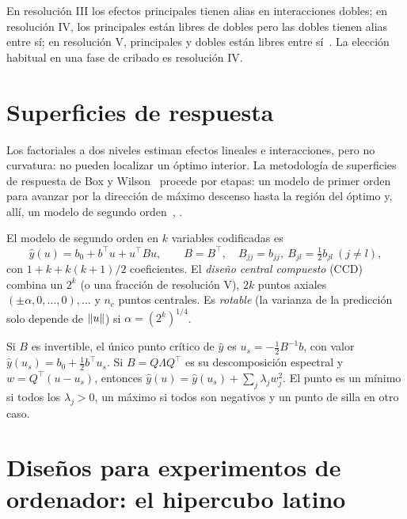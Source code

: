 En resolución III los efectos principales tienen alias en interacciones dobles; en resolución IV, los principales están libres de dobles pero las dobles tienen alias entre sí; en resolución V, principales y dobles están libres entre sí~\cite[§8.6–8.7]{montgomery}. La elección habitual en una fase de cribado es resolución IV.

\addtocounter{definicion}{1}%

\section{Superficies de respuesta}

Los factoriales a dos niveles estiman efectos lineales e interacciones, pero no curvatura: no pueden localizar un óptimo interior. La metodología de superficies de respuesta de Box y Wilson~\cite{boxwilson} procede por etapas: un modelo de primer orden para avanzar por la dirección de máximo descenso hasta la región del óptimo y, allí, un modelo de segundo orden~\cite[§11.1–11.3]{montgomery}, \cite[lección~11]{psu503}.

\begin{definicion}\label{def:ccd}
El modelo de segundo orden en $k$ variables codificadas es
\[
\hat y(u)=b_0+b^\top u+u^\top B u,\qquad B=B^\top,\quad B_{jj}=b_{jj},\ B_{jl}=\tfrac12 b_{jl}\ (j\ne l),
\]
con $1+k+k(k+1)/2$ coeficientes. El \emph{diseño central compuesto} (CCD) combina un $2^k$ (o una fracción de resolución V), $2k$ puntos axiales $(\pm\alpha,0,\dots,0),\dots$ y $n_c$ puntos centrales. Es \emph{rotable} (la varianza de la predicción solo depende de $\lVert u\rVert$) si $\alpha=(2^k)^{1/4}$.
\end{definicion}

\begin{proposicion}\label{prop:estacionario}
Si $B$ es invertible, el único punto crítico de $\hat y$ es $u_s=-\tfrac12B^{-1}b$, con valor $\hat y(u_s)=b_0+\tfrac12 b^\top u_s$. Si $B=Q\Lambda Q^\top$ es su descomposición espectral y $w=Q^\top(u-u_s)$, entonces $\hat y(u)=\hat y(u_s)+\sum_j\lambda_jw_j^2$. El punto es un mínimo si todos los $\lambda_j>0$, un máximo si todos son negativos y un punto de silla en otro caso.
\end{proposicion}

\addtocounter{definicion}{1}%

\section{Diseños para experimentos de ordenador: el hipercubo latino}

